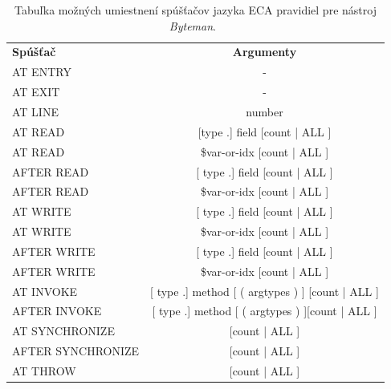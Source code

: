 \documentclass[11pt,final,oneside]{fithesis}
\newenvironment{example}[1]
{
\vspace{3mm}
\noindent\textbf{#1}
\vspace{2mm}
}
{
\vspace{3mm}
}
\begin{document}
\begin{table}
  \begin{tabular}{| l | c |}
    \hline
    \textbf{Spúšťač} & \textbf{Argumenty} \\
    \hhline{|=|=|}
    AT ENTRY & - \\ \hline
    AT EXIT & - \\ \hline
    AT LINE & number \\ \hline
    AT READ & [type .] field [count | ALL ] \\ \hline
    AT READ & \$var-or-idx [count | ALL ] \\ \hline
    AFTER READ & [ type .] field [count | ALL ] \\ \hline
    AFTER READ & \$var-or-idx [count | ALL ] \\ \hline
    AT WRITE & [ type .] field [count | ALL ] \\ \hline
    AT WRITE & \$var-or-idx [count | ALL ] \\ \hline
    AFTER WRITE & [ type .] field [count | ALL ] \\ \hline
    AFTER WRITE & \$var-or-idx [count | ALL ] \\ \hline
    AT INVOKE & [ type .] method [ ( argtypes ) ] [count | ALL ] \\ \hline
    AFTER INVOKE & [ type .] method [ ( argtypes ) ][count | ALL ] \\ \hline
    AT SYNCHRONIZE & [count | ALL ] \\ \hline
    AFTER SYNCHRONIZE & [count | ALL ] \\ \hline
    AT THROW & [count | ALL ] \\
    \hline
  \end{tabular}
  \caption{Tabuľka možných umiestnení spúšťačov jazyka ECA pravidiel pre
  nástroj \textit{Byteman}.~\cite{RedHat:Byteman}}
  \label{tab:tab6}
\end{table}

%
%
\end{document}
